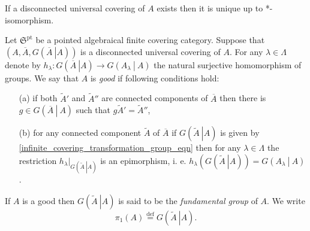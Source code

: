 \documentclass{beamer}
\theoremstyle{plain}
\newcommand{\la}{\lambda}
\newcommand{\La}{\Lambda}
\newcommand{\bydef}{\stackrel{\mathrm{def}}{=}}
\begin{document}
\begin{frame}
\begin{lemma}\label{uni_dicsonnected_lem}
	If a disconnected universal covering of $A$ exists then it is unique up to *-isomorphism. 
\end{lemma}

\begin{definition}\label{good_defn}
	Let	$\mathfrak{S}^{\mathrm{pt}}$ be a pointed algebraical  finite covering category.   Suppose that $\left(A, \overline{A}, G\left(\left.\overline{A}~\right| A\right)\right)$ is a disconnected universal covering of $A$. For any $\la \in \La$ denote by $h_\la: G\left(\left.\overline{A}~\right| A\right) \to G\left(\left. A_\la~\right|~A \right)$ the natural surjective homomorphism of groups.
	We say  that $A$  is \textit{good} if  following conditions hold:
	\begin{enumerate}
		\item[(a)] if both $\widetilde{A}'$ and $\widetilde{A}''$ are  {connected components} of $\overline A$ then there is  $g \in G\left(\left.\overline{A}~\right|~ A\right)$ such that $g \widetilde{A}'= \widetilde{A}''$,
		\item [(b)] for any connected component $\widetilde A$ of $\overline{A}$ if  $G\left(\left.\widetilde{A}~\right| A\right)$ is given by  \eqref{infinite_covering_transformation_group_eqn} then for any $\la \in \La$ the restriction $h_\la|_{G\left(\left.\widetilde{A}~\right| A\right)}$ is an epimorphism, i. e. $h_\la\left(G\left(\left.\widetilde{A}~\right| A\right) \right) = G\left(\left. A_\la~\right|~A \right)$.
	\end{enumerate}
\end{definition}

\end{frame}
\begin{frame}
	\begin{definition}
	If 	$A$ is a good then $G\left(\left.\widetilde{A}~\right| A\right)$ is said to be the \textit{fundamental group} of $A$. We write
	$$
\pi_1\left(A \right) \bydef G\left(\left.\widetilde{A}~\right| A\right).	
	$$
	\end{definition}
\end{frame}
\end{document}
